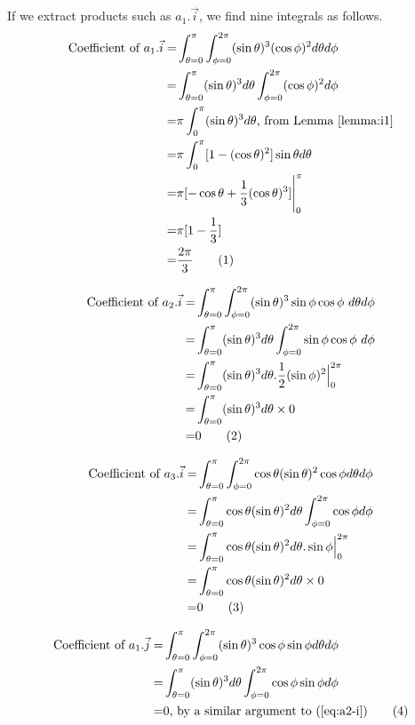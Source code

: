 \documentclass[]{article}
\newcommand\numberthis{\addtocounter{equation}{1}\tag{\theequation}}
\begin{document}
If we extract products such as $a_1.\vec{i}$, we find nine integrals as follows.
\begin{align*}
\text{Coefficient of }a_1.\vec{i} =&\int_{\theta=0}^{\pi}\int_{\phi=0}^{2\pi}(\sin\theta)^3(\cos\phi)^2 d\theta d\phi\\
=&\int_{\theta=0}^{\pi}(\sin\theta)^3d\theta\int_{\phi=0}^{2\pi}(\cos\phi)^2  d\phi\\
=&\pi \int_{0}^{\pi}(\sin\theta)^3d\theta\text{, from Lemma \ref{lemma:i1}}\\
=&\pi \int_{0}^{\pi} [1-(\cos \theta)^2] \sin\theta d\theta  \\
=& \pi [-\cos\theta+\frac{1}{3}(\cos\theta)^3]\Bigg|_0^{\pi} \\
=& \pi [1-\frac{1}{3}] \\
=& \frac{2\pi}{3}\numberthis \label{eq:a1-i}
\end{align*}

\begin{align*}
\text{Coefficient of }a_2.\vec{i} =&\int_{\theta=0}^{\pi}\int_{\phi=0}^{2\pi}(\sin\theta)^3\sin\phi\cos\phi\ d\theta d\phi\\=&\int_{\theta=0}^{\pi}(\sin\theta)^3d\theta\int_{\phi=0}^{2\pi}\sin\phi\cos\phi\  d\phi\\
=&\int_{\theta=0}^{\pi}(\sin\theta)^3d\theta . \frac{1}{2} (\sin \phi)^2 \Big|_0^{2\pi} \\
=&\int_{\theta=0}^{\pi}(\sin\theta)^3d\theta\times 0\\
=&0 \numberthis \label{eq:a2-i}
\end{align*}

\begin{align*}
\text{Coefficient of }a_3.\vec{i} =&\int_{\theta=0}^{\pi}\int_{\phi=0}^{2\pi}\cos\theta(\sin\theta)^2\cos\phi d\theta d\phi\\=&\int_{\theta=0}^{\pi}\cos\theta(\sin\theta)^2d\theta\int_{\phi=0}^{2\pi}\cos\phi  d\phi\\
=&\int_{\theta=0}^{\pi}\cos\theta(\sin\theta)^2d\theta . \sin\phi \Big|_0^{2\pi}\\
=&\int_{\theta=0}^{\pi}\cos\theta(\sin\theta)^2d\theta \times 0\\
=&0 \numberthis \label{eq:a3-i}
\end{align*}

\begin{align*}
\text{Coefficient of }a_1.\vec{j} =&\int_{\theta=0}^{\pi}\int_{\phi=0}^{2\pi}(\sin\theta)^3\cos\phi\sin\phi d\theta d\phi\\=&\int_{\theta=0}^{\pi}(\sin\theta)^3d\theta\int_{\phi=0}^{2\pi}\cos\phi\sin\phi  d\phi\\
=&0 \text{, by a similar argument to (\ref{eq:a2-i})}\numberthis \label{eq:a1-j}
\end{align*}
\end{document}

